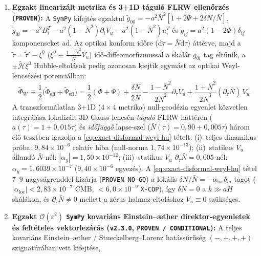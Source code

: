 \documentclass[11pt,a4paper]{article}
\begin{document}
\begin{enumerate}
    \item \textbf{Egzakt linearizált metrika és 3+1D táguló FLRW ellenőrzés (\texttt{PROVEN}):}
    A \texttt{SymPy} kifejtés egzaktul $\tilde{g}_{00} = -a^2\bar{N}^2[1 + 2\Psi + 2\delta N/\bar{N}]$, $\tilde{g}_{0i} = -a^2 B_i^T - a^2(1-\bar{N}^2)\partial_i V_u - a^2(1-\bar{N}^2)u_i^T$ és $\tilde{g}_{ij} = a^2(1-2\Phi)\delta_{ij}$ komponenseket ad. Az optikai konform időre ($\mathrm{d}\tilde{\tau} = \bar{N}\mathrm{d}\tau$) áttérve, majd a $\tilde{\tau} = \tilde{\tau}' - \xi^0$ ($\xi^0 \equiv \frac{1-\bar{N}^2}{\bar{N}}V_u$) idő-diffeomorfizmussal a skalár $\tilde{g}_{0i}$ tag eltűnik, a $\pm\tilde{\mathcal{H}}\xi^0$ Hubble-eltolások pedig azonosan kiejtik egymást az optikai Weyl-lencsézési potenciálban:
    \begin{equation}
        \tilde{\Phi}_W \equiv \frac{1}{2}\bigl(\tilde{\Phi}_{\mathrm{eff}} + \tilde{\Psi}_{\mathrm{eff}}\bigr) = \frac{1}{2}(\Phi + \Psi) + \frac{\delta N}{2\bar{N}} - \frac{1 - \bar{N}^2}{2\bar{N}^2}\partial_\tau V_u + \frac{1 + \bar{N}^2}{2\bar{N}^3}(\partial_\tau\bar{N})\,V_u.
        \label{eq:exact-disformal-weyl-hu}
    \end{equation}
    A transzformálatlan 3+1D ($4\times 4$ metrika) null-geodézia egyenlet közvetlen integrálása lokalizált 3D Gauss-lencsén \emph{táguló} FLRW háttéren ($a(\tau) = 1 + 0{,}015\tau$) és \emph{időfüggő} lapse-szel ($\bar{N}(\tau) = 0{,}90 + 0{,}005\tau$) három élő tesztben igazolja a \eqref{eq:exact-disformal-weyl-hu} tételt: (i)~teljes dinamikus próba: $9{,}84\times 10^{-6}$ relatív hiba (null-norma $1{,}74\times 10^{-13}$); (ii)~statikus $V_u$ állandó $\bar{N}$-nél: $|\alpha_y| = 1{,}50\times 10^{-12}$; (iii)~statikus $V_u$ $\partial_\tau\bar{N} = 0{,}005$-nél: $\alpha_y = 1{,}6039\times 10^{-7}$ ($9{,}40\times 10^{-6}$ egyezés). A \eqref{eq:exact-disformal-weyl-hu} tétel $7\text{--}9$ nagyságrenddel kizárja (\texttt{PROVEN NO-GO}) a lokális $\delta N/\bar{N} = -\alpha_{\mathrm{loc}}\delta_m$ tagot ($|\alpha_{\mathrm{loc}}| < 2{,}83\times 10^{-7}$ CMB, $< 6{,}0\times 10^{-9}$ \texttt{X-COP}), így $\delta N = 0$ a $k\gg aH$ skálákon, és $\partial_\tau\bar{N}\neq 0$ mellett a zérus halmaz-eltoláshoz $V_u \equiv 0$ szükséges.
    \item \textbf{Egzakt $\mathcal{O}(\varepsilon^2)$ \texttt{SymPy} kovariáns Einstein--\ae{}ther direktor-egyenletek és feltételes vektorlezárás (\texttt{v2.3.0}, \texttt{PROVEN / CONDITIONAL}):}
    A teljes kovariáns Einstein--\ae{}ther / Stueckelberg--Lorenz hatássűrűség $(-,+,+,+)$ szignatúrában vett kifejtése,

\end{enumerate}
\end{document}
